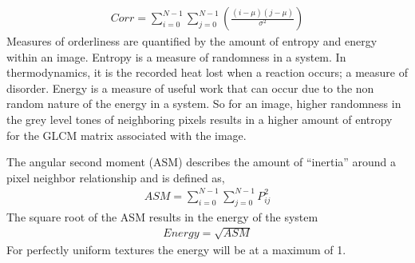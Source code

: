 \begin{align}
    Corr = \sum_{i=0}^{N-1}\sum_{j=0}^{N-1}(\frac{(i-\mu)(j-\mu)}{\sigma^2})
\end{align}
%
Measures of orderliness are quantified by the amount of entropy and energy within an image.  Entropy is a measure of randomness in a system.  In thermodynamics, it is the recorded heat lost when a reaction occurs; a measure of disorder.  Energy is a measure of useful work that can occur due to the non random nature of the energy in a system.  So for an image, higher randomness in the grey level tones of neighboring pixels results in a higher amount of entropy for the GLCM matrix associated with the image.

The angular second moment (ASM) describes the amount of “inertia” around a pixel neighbor relationship and is defined as,
%
\begin{align}
    ASM = \sum_{i=0}^{N-1}\sum_{j=0}^{N-1}P_{ij}^2
\end{align}
%
The square root of the ASM results in the energy of the system
%
\begin{align}
    Energy = \sqrt{ASM}
\end{align}
%
For perfectly uniform textures the energy will be at a maximum of 1.

